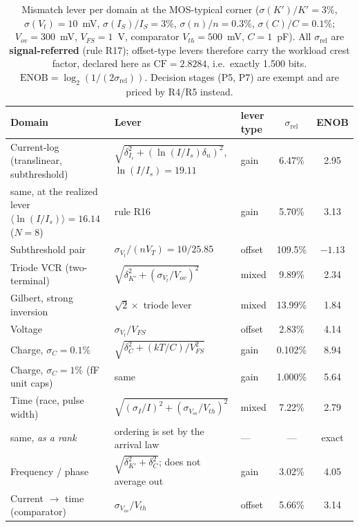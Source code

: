 \documentclass[11pt]{article}
\begin{document}
\begin{table}[h]
\centering
\caption{Mismatch lever per domain at the MOS-typical corner ($\sigma(K')/K' = 3\%$, $\sigma(V_t) = 10$~mV, $\sigma(I_S)/I_S = 3\%$, $\sigma(n)/n = 0.3\%$, $\sigma(C)/C = 0.1\%$; $V_{ov} = 300$~mV, $V_{FS} = 1$~V, comparator $V_{th} = 500$~mV, $C = 1$~pF). All $\sigma_{\mathrm{rel}}$ are \textbf{signal-referred} (rule R17); offset-type levers therefore carry the workload crest factor, declared here as $\mathrm{CF} = 2.8284$, i.e.\ exactly 1.500 bits. $\mathrm{ENOB} = \log_2(1/(2\sigma_{\mathrm{rel}}))$. Decision stages (P5, P7) are exempt and are priced by R4/R5 instead.}
\label{tab:domains}
\footnotesize
\begin{tabular}{p{2.7cm}p{4.6cm}p{2.1cm}cc}
\toprule
Domain & Lever & lever type & $\sigma_{\mathrm{rel}}$ & ENOB \\
\midrule
Current-log (translinear, subthreshold) & $\sqrt{\delta_{I_s}^2 + (\ln(I/I_s)\delta_n)^2}$, $\ln(I/I_s)=19.11$ & gain & 6.47\% & 2.95 \\
\quad same, at the realized lever $\langle \ln(I/I_s)\rangle = 16.14$ ($N=8$) & rule R16 & gain & 5.70\% & 3.13 \\
Subthreshold pair~\cite{vittoz1977} & $\sigma_{V_t}/(nV_T) = 10/25.85$ & offset & 109.5\% & $-1.13$ \\
Triode VCR (two-terminal) & $\sqrt{\delta_{K'}^2 + (\sigma_{V_t}/V_{ov})^2}$ & mixed & 9.89\% & 2.34 \\
Gilbert, strong inversion & $\sqrt2\times$ triode lever & mixed & 13.99\% & 1.84 \\
Voltage & $\sigma_{V_t}/V_{FS}$ & offset & 2.83\% & 4.14 \\
Charge, $\sigma_C = 0.1\%$ & $\sqrt{\delta_C^2 + (kT/C)/V_{FS}^2}$ & gain & 0.102\% & 8.94 \\
Charge, $\sigma_C = 1\%$ (fF unit caps) & same & gain & 1.000\% & 5.64 \\
Time (race, pulse width) & $\sqrt{(\sigma_I/I)^2 + (\sigma_{V_{os}}/V_{th})^2}$ & mixed & 7.22\% & 2.79 \\
\quad same, \textit{as a rank} & ordering is set by the arrival law & --- & --- & exact \\
Frequency / phase~\cite{hajimiri1998} & $\sqrt{\delta_{K'}^2 + \delta_C^2}$; does not average out & gain & 3.02\% & 4.05 \\
Current $\to$ time (comparator) & $\sigma_{V_{os}}/V_{th}$ & offset & 5.66\% & 3.14 \\
\bottomrule
\end{tabular}
\end{table}
\end{document}
